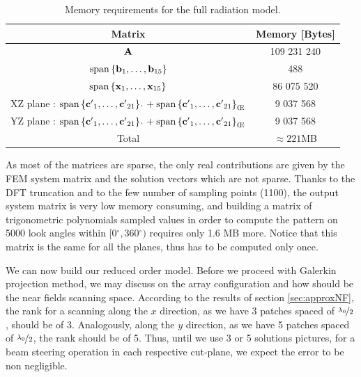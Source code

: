 \begin{table}[!tbp]
\centering
\begin{tabular}{|c|c|}
\hline Matrix & Memory [Bytes]\\
\hline \hline
$\mathbf{A}$ & 109 231 240 \\
$\mathrm{span} \left \{ \mathbf{b}_1, \ldots, \mathbf{b}_{15} \right \} $ & 488 \\
$\mathrm{span} \left \{ \mathbf{x}_1, \ldots, \mathbf{x}_{15} \right \}$ & 86 075 520 \\
XZ plane : $\mathrm{span} \left \{ \mathbf{c}{'}_1, \ldots, \mathbf{c}{'}_{21} \right \}_{\mathrm{\theta}} + \mathrm{span} \left \{ \mathbf{c}{'}_1, \ldots, \mathbf{c}{'}_{21} \right \}_{\mathrm{\phi}}$ & 9 037 568 \\
YZ plane : $\mathrm{span} \left \{ \mathbf{c}{'}_1, \ldots, \mathbf{c}{'}_{21} \right \}_{\mathrm{\theta}} + \mathrm{span} \left \{ \mathbf{c}{'}_1, \ldots, \mathbf{c}{'}_{21} \right \}_{\mathrm{\phi}}$ & 9 037 568 \\
\hline Total & $\approx 221$MB \\
\hline
\end{tabular}
\caption{Memory requirements for the full radiation model.}
\label{tab:memFull}
\end{table} As most of the matrices are sparse, the only real contributions are given by the FEM system matrix and the solution vectors which are not sparse. Thanks to the DFT truncation and to the few number of sampling points (1100), the output system matrix is very low memory consuming, and building a matrix of trigonometric polynomials sampled values in order to compute the pattern on 5000 look angles within $[0\ensuremath{^\circ}, 360\ensuremath{^\circ})$ requires only 1.6 MB more. Notice that this matrix is the same for all the planes, thus has to be computed only once.

\par We can now build our reduced order model. Before we proceed with Galerkin projection method, we may discuss on the array configuration and how should be the near fields scanning space. According to the results of section \ref{sec:approxNF}, the rank for a scanning along the $x$ direction, as we have 3 patches spaced of $\nicefrac{\lambda_0}{2}$, should be of 3. Analogously, along the $y$ direction, as we have 5 patches spaced of $\nicefrac{\lambda_0}{2}$, the rank should be of 5. Thus, until we use 3 or 5 solutions pictures, for a beam steering operation in each respective cut-plane, we expect the error to be non negligible.

